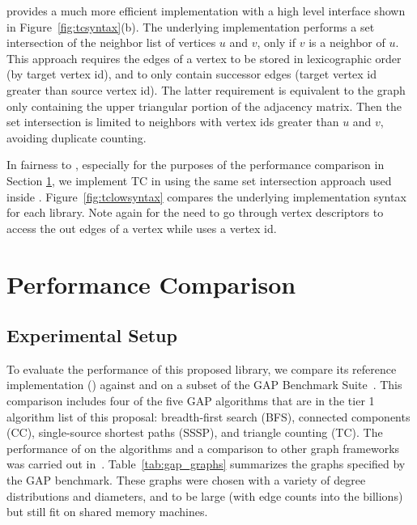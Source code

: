 \stdgraph provides a much more efficient implementation with a high level
interface shown in Figure~\ref{fig:tcsyntax}(b).
The underlying \stdgraph implementation performs a set intersection
of the neighbor list of vertices $u$ and $v$, only if $v$ is a neighbor of $u$.
This approach  requires the edges of a vertex to be stored
in lexicographic order (by target vertex id), and to only contain successor
edges (target vertex id greater than source vertex id). The latter
requirement is equivalent to the graph only containing the upper triangular
portion of the adjacency matrix.
Then the set intersection is limited to neighbors with vertex ids greater
than $u$ and $v$, avoiding duplicate counting.

In fairness to \bgl, especially for the purposes of the performance comparison
in Section \ref{performance}, we implement TC in \bgl using the same set
intersection approach used inside \stdgraph.
Figure~\ref{fig:tclowsyntax} compares the underlying implementation syntax
for each library.
Note again for \bgl the need to go through vertex descriptors to access the out
edges of a vertex while \stdgraph uses a vertex id.

\clearpage

\section{Performance Comparison} \label{performance}
\subsection{Experimental Setup}
To evaluate the performance of this proposed library, we compare its reference implementation
(\stdgraph) against \bgl and \nwgraph on a subset of the GAP Benchmark Suite~\cite{beamer2015gap}.
This comparison includes four of the five GAP algorithms that are in the tier 1 algorithm list of this proposal:
breadth-first search (BFS), connected components (CC), single-source shortest paths (SSSP), 
and triangle counting (TC).  The performance of \nwgraph on the algorithms and a comparison to other
graph frameworks was carried out in~\cite{gapbs_2023}.
Table~\ref{tab:gap_graphs} summarizes the graphs specified by the GAP benchmark.
These graphs were chosen with a variety of degree distributions and diameters, and to be large (with edge counts into the billions) but still fit on shared memory machines.


